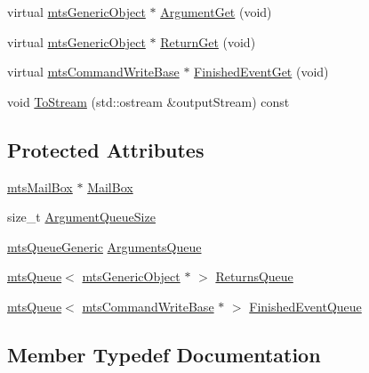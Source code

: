 \begin{DoxyCompactItemize}
\item 
virtual \hyperlink{classmts_generic_object}{mts\+Generic\+Object} $\ast$ \hyperlink{classmts_command_queued_write_return_base_ac990bbaa33da59f15662c78b569bb7d8}{Argument\+Get} (void)
\item 
virtual \hyperlink{classmts_generic_object}{mts\+Generic\+Object} $\ast$ \hyperlink{classmts_command_queued_write_return_base_a46c9521b17082860b27884a880ba2d84}{Return\+Get} (void)
\item 
virtual \hyperlink{classmts_command_write_base}{mts\+Command\+Write\+Base} $\ast$ \hyperlink{classmts_command_queued_write_return_base_ad5cf9aa9b24a5cc8b5e63c727471d748}{Finished\+Event\+Get} (void)
\item 
void \hyperlink{classmts_command_queued_write_return_base_ad9ed47f186820a6bdf3de9f11101fbe0}{To\+Stream} (std\+::ostream \&output\+Stream) const 
\end{DoxyCompactItemize}
\subsection*{Protected Attributes}
\begin{DoxyCompactItemize}
\item 
\hyperlink{classmts_mail_box}{mts\+Mail\+Box} $\ast$ \hyperlink{classmts_command_queued_write_return_base_ab619fecbd720f4b87db6169d1f210e16}{Mail\+Box}
\item 
size\+\_\+t \hyperlink{classmts_command_queued_write_return_base_a3ca30eb9477f0e972799e27948707375}{Argument\+Queue\+Size}
\item 
\hyperlink{classmts_queue_generic}{mts\+Queue\+Generic} \hyperlink{classmts_command_queued_write_return_base_ac846c793220de2f8b31357230428434f}{Arguments\+Queue}
\item 
\hyperlink{classmts_queue}{mts\+Queue}$<$ \hyperlink{classmts_generic_object}{mts\+Generic\+Object} $\ast$ $>$ \hyperlink{classmts_command_queued_write_return_base_a24118cfab2f7edbc060a3513787900c7}{Returns\+Queue}
\item 
\hyperlink{classmts_queue}{mts\+Queue}$<$ \hyperlink{classmts_command_write_base}{mts\+Command\+Write\+Base} $\ast$ $>$ \hyperlink{classmts_command_queued_write_return_base_aea7fcf280a846a7d73fb7ba81499e858}{Finished\+Event\+Queue}
\end{DoxyCompactItemize}


\subsection{Member Typedef Documentation}
\hypertarget{classmts_command_queued_write_return_base_a1c16e3d09d9bb0071bb50f31ba81b4a8}{}
